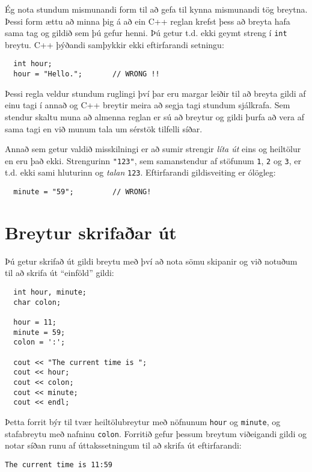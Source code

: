 \vspace{0.1in}
\centerline{}
\vspace{0.1in}

Ég nota stundum mismunandi form til að gefa til kynna mismunandi tög breytna.
Þessi form ættu að minna þig á að ein C++ reglan krefst þess að breyta hafa sama tag og gildið sem þú gefur henni.
Þú getur t.d. ekki geymt streng í {\tt int} breytu.
C++ þýðandi samþykkir ekki eftirfarandi setningu: 

\begin{verbatim}
  int hour;
  hour = "Hello.";       // WRONG !!
\end{verbatim}
%
Þessi regla veldur stundum ruglingi því þar eru margar leiðir til að breyta gildi af einu tagi í annað og C++ breytir meira að segja tagi stundum sjálkrafa.
Sem stendur skaltu muna að almenna reglan er sú að breytur og gildi þurfa að vera af sama tagi en við munum tala um sérstök tilfelli síðar.

Annað sem getur valdið misskilningi er að sumir strengir {\em líta út} eins og heiltölur en eru það ekki.
Strengurinn {\tt "123"}, sem samanstendur af stöfunum {\tt 1}, {\tt 2} og {\tt 3}, er t.d. ekki sami hluturinn og {\em talan} {\tt 123}.
Eftirfarandi gildisveiting er ólögleg:

\begin{verbatim}
  minute = "59";         // WRONG!
\end{verbatim}
%
\section{Breytur skrifaðar út}
\label{output}

Þú getur skrifað út gildi breytu með því að nota sömu skipanir og við notuðum til að skrifa út ``einföld'' gildi:

\begin{verbatim}
  int hour, minute;
  char colon;

  hour = 11;
  minute = 59;
  colon = ':';

  cout << "The current time is ";
  cout << hour;
  cout << colon;
  cout << minute;
  cout << endl;
\end{verbatim}
%
Þetta forrit býr til tvær heiltölubreytur með nöfnunum {\tt hour} og {\tt minute}, og stafabreytu með nafninu {\tt colon}.
Forritið gefur þessum breytum viðeigandi gildi og notar síðan runu af úttakssetningum til að skrifa út eftirfarandi: 

\begin{verbatim}
The current time is 11:59
\end{verbatim}

